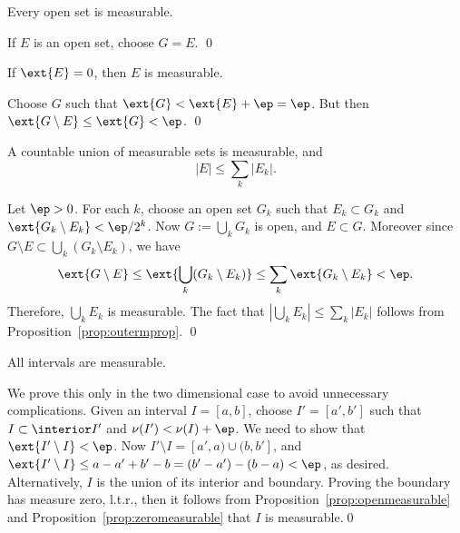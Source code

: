 \begin{prop} \label{prop:openmeasurable}
Every open set is measurable.
\end{prop}

\pf If $E$ is an open set, choose $G=E$. \qed \\


\begin{prop} \label{prop:zeromeasurable}
If $\ext{E}=0$, then $E$ is measurable. 
\end{prop}

\pf Choose $G$ such that $\ext{G}<\ext{E}+\ep=\ep$. But then $\ext{G \setminus E} \leq \ext{G}<\ep$. \qed \\

\begin{prop}
A countable union of measurable sets is measurable, and 
	\[
	|E| \leq \sum_k |E_k|.
	\]
\end{prop}

\pf Let $\ep>0$. For each $k$, choose an open set $G_k$ such that $E_k \subset G_k$ and $\ext{G_k\setminus E_k}< \ep/2^k$. Now $G:= \bigcup_k G_k$ is open, and $E \subset G$. Moreover since $G \setminus E \subset \bigcup_k (G_k \setminus E_k)$, we have
	\[
	\ext{G\setminus E} \leq \ext{\bigcup_k (G_k \setminus E_k)} \leq \sum_k \ext{G_k \setminus E_k}< \ep.
	\]
Therefore, $\bigcup_k E_k$ is measurable. The fact that $\left|\bigcup_k E_k\right| \leq \sum_k |E_k|$ follows from Proposition~\ref{prop:outermprop}. \qed \\



\begin{prop}
All intervals are measurable.
\end{prop}

\pfsk We prove this only in the two dimensional case to avoid unnecessary complications. Given an interval $I=[a,b]$, choose $I'=[a',b']$ such that $I \subset \interior I'$ and $\nu(I')< \nu(I)+\ep$. We need to show that $\ext{I' \setminus I}<\ep$. Now $I' \setminus I=[a',a) \cup (b,b']$, and $\ext{I' \setminus I} \leq a-a'+b'-b= (b'-a') - (b-a)<\ep$, as desired. Alternatively, $I$ is the union of its interior and boundary. Proving the boundary has measure zero, l.t.r., then it follows from Proposition~\ref{prop:openmeasurable} and Proposition~\ref{prop:zeromeasurable} that $I$ is measurable.\qed \\


